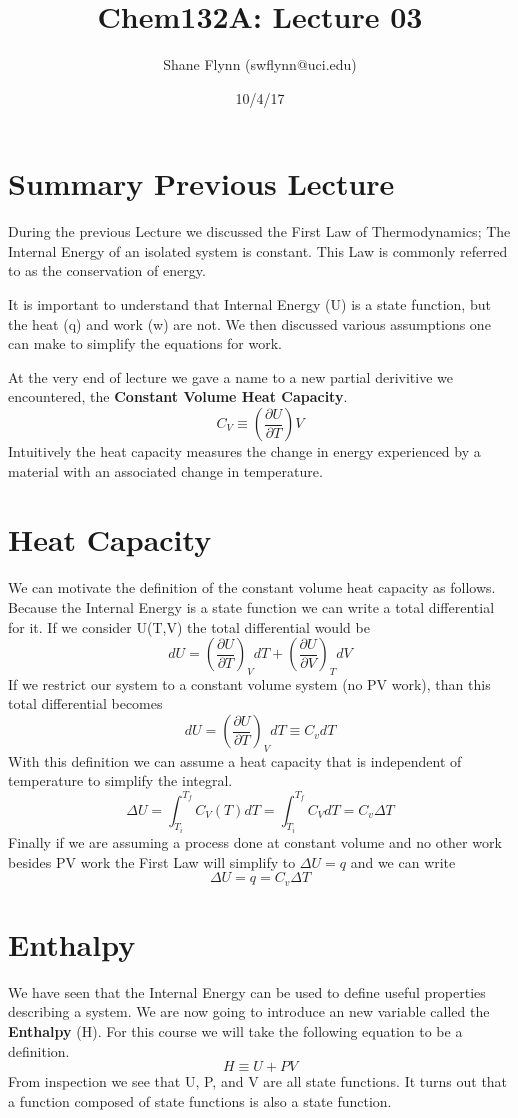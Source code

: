 \documentclass{article}
\title{Chem132A: Lecture 03}
\author{Shane Flynn (swflynn@uci.edu) }
\date{10/4/17}
\newcommand{\be}{\begin{equation}}
\newcommand{\ee}{\end{equation}}
\newcommand{\pd}{\partial}
\begin{document}
\maketitle

\section*{Summary Previous Lecture}
During the previous Lecture we discussed the First Law of Thermodynamics; The Internal Energy of an isolated system is constant.
This Law is commonly referred to as the conservation of energy. 

It is important to understand that Internal Energy (U) is a state function, but the heat (q) and work (w) are not.
We then discussed various assumptions one can make to simplify the equations for work. 

At the very end of lecture we gave a name to a new partial derivitive we encountered, the \textbf{Constant Volume Heat Capacity}. 
\be
C_V \equiv \left(\frac{\pd U}{\pd T}\right)V
\ee
Intuitively the heat capacity measures the change in energy experienced by a material with an associated change in temperature. 

\section*{Heat Capacity}
We can motivate the definition of the constant volume heat capacity as follows.
Because the Internal Energy is a state function we can write a total differential for it. 
If we consider U(T,V) the total differential would be 
\be
dU = \left(\frac{\pd U}{\pd T}\right)_VdT + \left(\frac{\pd U}{\pd V}\right)_T dV 
\ee
If we restrict our system to a constant volume system (no PV work), than this total differential becomes 
\be
dU = \left(\frac{\pd U}{\pd T}\right)_VdT \equiv C_v dT
\ee
With this definition we can assume a heat capacity that is independent of temperature to simplify the integral. 
\be
\Delta U = \int_{T_i}^{T_f} C_V(T) dT = \int_{T_i}^{T_f} C_V dT = C_v\Delta T
\ee
Finally if we are assuming a process done at constant volume and no other work besides PV work the First Law will simplify to $\Delta U = q$ and we can write
\be
\Delta U = q = C_v\Delta T 
\ee

\section*{Enthalpy}
We have seen that the Internal Energy can be used to define useful properties describing a system. 
We are now going to introduce an new variable called the \textbf{Enthalpy} (H). 
For this course we will take the following equation to be a definition. 
\be
H \equiv U + PV
\ee
From inspection we see that U, P, and V are all state functions. 
It turns out that a function composed of state functions is also a state function.
\end{document}
